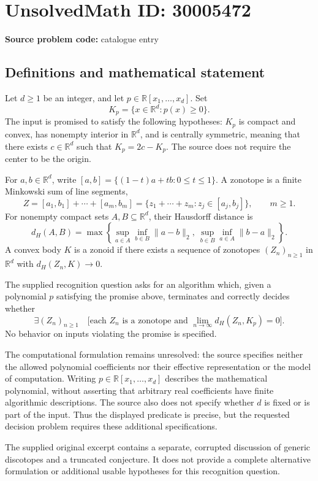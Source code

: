 \documentclass[11pt]{article}
\newcommand{\R}{\mathbb{R}}
\begin{document}
\section*{UnsolvedMath ID: 30005472}
\textbf{Source problem code:} catalogue entry
\subsection{Definitions and mathematical statement}
Let \(d\geq 1\) be an integer, and let \(p\in\R[x_1,\ldots,x_d]\). Set
\[
K_p=\{x\in\R^d:p(x)\geq 0\}.
\]
The input is promised to satisfy the following hypotheses: \(K_p\) is compact and convex, has nonempty interior in \(\R^d\), and is centrally symmetric, meaning that there exists \(c\in\R^d\) such that \(K_p=2c-K_p\). The source does not require the center to be the origin.

For \(a,b\in\R^d\), write \([a,b]=\{(1-t)a+tb:0\leq t\leq 1\}\). A zonotope is a finite Minkowski sum of line segments,
\[
Z=[a_1,b_1]+\cdots+[a_m,b_m]
 =\{z_1+\cdots+z_m:z_j\in[a_j,b_j]\},\qquad m\geq 1.
\]
For nonempty compact sets \(A,B\subseteq\R^d\), their Hausdorff distance is
\[
d_H(A,B)=\max\left\{\sup_{a\in A}\inf_{b\in B}\|a-b\|_2,\ \sup_{b\in B}\inf_{a\in A}\|b-a\|_2\right\}.
\]
A convex body \(K\) is a zonoid if there exists a sequence of zonotopes \((Z_n)_{n\geq1}\) in \(\R^d\) with \(d_H(Z_n,K)\to0\).

The supplied recognition question asks for an algorithm which, given a polynomial \(p\) satisfying the promise above, terminates and correctly decides whether
\[
\exists (Z_n)_{n\geq1}\quad
\bigl[\text{each }Z_n\text{ is a zonotope and }\lim_{n\to\infty}d_H(Z_n,K_p)=0\bigr].
\]
No behavior on inputs violating the promise is specified.

The computational formulation remains unresolved: the source specifies neither the allowed polynomial coefficients nor their effective representation or the model of computation. Writing \(p\in\R[x_1,\ldots,x_d]\) describes the mathematical polynomial, without asserting that arbitrary real coefficients have finite algorithmic descriptions. The source also does not specify whether \(d\) is fixed or is part of the input. Thus the displayed predicate is precise, but the requested decision problem requires these additional specifications.

The supplied original excerpt contains a separate, corrupted discussion of generic discotopes and a truncated conjecture. It does not provide a complete alternative formulation or additional usable hypotheses for this recognition question.
\end{document}
